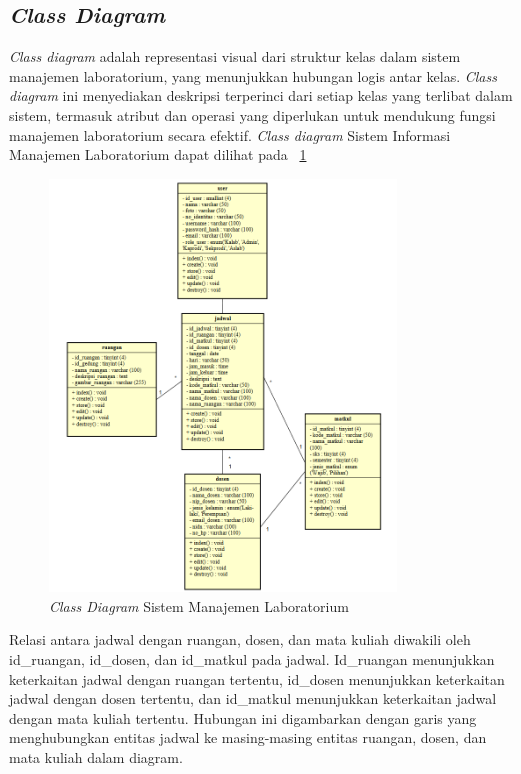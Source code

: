 \subsection{\textit{Class Diagram}}
\textit{Class diagram} adalah representasi visual dari struktur kelas dalam sistem manajemen laboratorium, yang menunjukkan hubungan logis antar kelas. \textit{Class diagram} ini menyediakan deskripsi terperinci dari setiap kelas yang terlibat dalam sistem, termasuk atribut dan operasi yang diperlukan untuk mendukung fungsi manajemen laboratorium secara efektif. \textit{Class diagram} Sistem Informasi Manajemen Laboratorium dapat dilihat pada \pic~\ref{class-diagram}

\begin{figure}
	\centering
	\includegraphics[width=0.82\textwidth]{konten/gambar/class-diagram.png}
	\caption{\textit{Class Diagram} Sistem Manajemen Laboratorium}
	\label{class-diagram}
\end{figure}

Relasi antara jadwal dengan ruangan, dosen, dan mata kuliah diwakili oleh id\_ruangan, id\_dosen, dan id\_matkul pada jadwal. Id\_ruangan menunjukkan keterkaitan jadwal dengan ruangan tertentu, id\_dosen menunjukkan keterkaitan jadwal dengan dosen tertentu, dan id\_matkul menunjukkan keterkaitan jadwal dengan mata kuliah tertentu. Hubungan ini digambarkan dengan garis yang menghubungkan entitas jadwal ke masing-masing entitas ruangan, dosen, dan mata kuliah dalam diagram.

